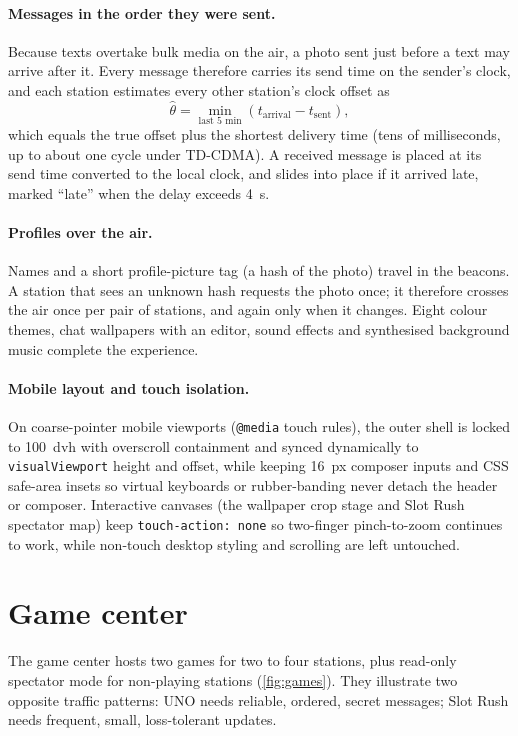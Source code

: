 \documentclass[11pt,a4paper,oneside]{report}
\newcommand{\code}[1]{\texttt{\small #1}}
\begin{document}
\paragraph{Messages in the order they were sent.} Because texts overtake bulk media on the air, a photo
sent just before a text may arrive after it. Every message therefore carries its send time on the
sender's clock, and each station estimates every other station's clock offset as
\begin{equation}
  \hat\theta=\min_{\text{last 5 min}}\left(t_\text{arrival}-t_\text{sent}\right),
\end{equation}
which equals the true offset plus the shortest delivery time (tens of milliseconds, up to about one
cycle under TD-CDMA). A received message is placed at its send time converted to the local clock, and
slides into place if it arrived late, marked ``late'' when the delay exceeds \SI{4}{s}.

\paragraph{Profiles over the air.} Names and a short profile-picture tag (a hash of the photo) travel in
the beacons. A station that sees an unknown hash requests the photo once; it therefore crosses the air
once per pair of stations, and again only when it changes. Eight colour themes, chat wallpapers with an
editor, sound effects and synthesised background music complete the experience.

\paragraph{Mobile layout and touch isolation.} On coarse-pointer mobile viewports
(\code{@media} touch rules), the outer shell is locked to \SI{100}{dvh} with overscroll containment and
synced dynamically to \code{visualViewport} height and offset, while keeping \SI{16}{px} composer inputs
and CSS safe-area insets so virtual keyboards or rubber-banding never detach the header or composer.
Interactive canvases (the wallpaper crop stage and Slot Rush spectator map) keep
\code{touch-action: none} so two-finger pinch-to-zoom continues to work, while non-touch desktop styling
and scrolling are left untouched.

\section{Game center}\label{sec:games}
The game center hosts two games for two to four stations, plus read-only spectator mode for non-playing stations
(\cref{fig:games}). They illustrate two opposite traffic patterns: UNO needs reliable, ordered, secret messages;
Slot Rush needs frequent, small, loss-tolerant updates.
\end{document}
